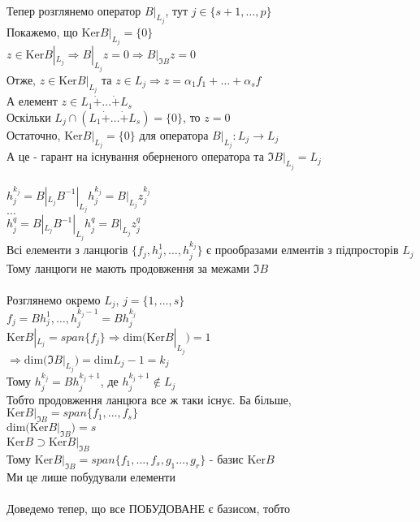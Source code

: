 \documentclass[a4paper, 14pt]{extarticle}
\def\dim#1{\textrm{dim} {#1}}
\def\ker#1{\textrm{Ker} {#1}}
\begin{document}
\\
Тепер розглянемо оператор $B|_{L_j}$, тут $j \in \{s+1,\dots,p\}$\\
Покажемо, що $\ker B|_{L_j} = \{0\}$\\
$z \in \ker B|_{L_j} \Rightarrow B|_{L_j}z = 0 \Rightarrow B|_{\Im B}z = 0$\\
Отже, $z \in  \ker B|_{L_j}$ та $z \in L_j \Rightarrow z = \alpha_1 f_1 + \dots + \alpha_s f$\\
А елемент $z \in L_1 \dot{+} \dots \dot{+} L_s$\\
Оскільки $L_j \cap (L_1 \dot{+} \dots \dot{+} L_s) = \{0\}$, то $z = 0$\\
Остаточно, $\ker B|_{L_j} = \{0\}$ для оператора $B|_{L_j}: L_j \to L_j$\\
А це - гарант на існування оберненого оператора та $\Im B|_{L_j} = L_j$\\
\\
$h_{j}^{k_j} = B|_{L_j} B^{-1}|_{L_j} h_{j}^{k_j} = B|_{L_j}z_j^{k_j}$\\
$\dots$\\
$h_{j}^{q} = B|_{L_j} B^{-1}|_{L_j} h_{j}^{q} = B|_{L_j}z_j^{q}$\\
Всі елементи з ланцюгів $\{f_j, h_j^1, \dots, h_j^{k_j}\}$ є прообразами елментів з підпросторів $L_j$\\
Тому ланцюги не мають продовження за межами $\Im B$\\
\\
Розглянемо окремо $L_j$, $j = \{1,\dots,s\}$\\
$f_j = Bh^1_j, \dots, h_j^{k_j-1} = Bh_j^{k_j}$\\
$\ker B|_{L_j} = span\{f_j\} \Rightarrow \dim(\ker B|_{L_j}) = 1$\\
$\Rightarrow \dim(\Im B|_{L_j}) = \dim L_j - 1 = k_j$\\
Тому $h_j^{k_j} = Bh_j^{k_j + 1}$, де $h_j^{k_j+1} \not\in L_j$\\
Тобто продовження ланцюга все ж таки існує. Ба більше, \\ 
$\ker B|_{\Im B} = span\{f_1,\dots,f_s\}$\\
$\dim (\ker B|_{\Im B}) = s$\\
$\ker B \supset \ker B|_{\Im B}$\\
Тому $\ker B|_{\Im B} = span\{f_1,\dots,f_s, g_1 \dots, g_r\}$ - базис $\ker B$\\
Ми це лише побудували елементи\\
\\
Доведемо тепер, що все ПОБУДОВАНЕ є базисом, тобто\\
\end{document}
